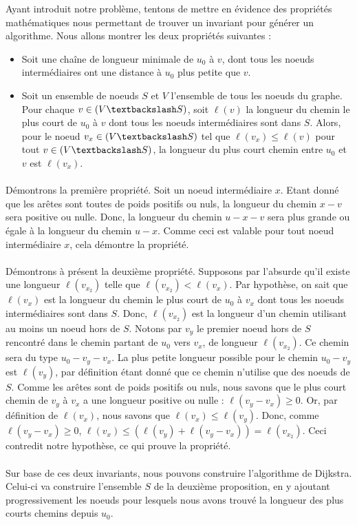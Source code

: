 
Ayant introduit notre problème, tentons de mettre en évidence des propriétés mathématiques nous permettant de trouver un invariant pour générer un algorithme. Nous allons montrer les deux propriétés suivantes : 
\begin{itemize}
	\item Soit une chaîne de longueur minimale de $u_0$ à $v$, dont tous les noeuds intermédiaires ont une distance à $u_0$ plus petite que $v$.
	\item Soit un ensemble de noeuds $S$ et $V$ l'ensemble de tous les noeuds du graphe. Pour chaque $v \in (V \textbackslash S)$, soit $\ell(v)$ la longueur du chemin le plus court de $u_0$ à $v$ dont tous les noeuds intermédiaires sont dans $S$. Alors, pour le noeud $v_x \in (V \textbackslash S)$ tel que $\ell(v_x) \leq \ell(v)$ pour tout $v \in (V \textbackslash S)$, la longueur du plus court chemin entre $u_0$ et $v$ est $\ell(v_x)$.
\end{itemize}

\paragraph{}

Démontrons la première propriété. Soit un noeud intermédiaire $x$. Etant donné que les arêtes sont toutes de poids positifs ou nuls, la longueur du chemin $x-v$ sera positive ou nulle. Donc, la longueur du chemin $u-x-v$ sera plus grande ou égale à la longueur du chemin $u-x$. Comme ceci est valable pour tout noeud intermédiaire $x$, cela démontre la propriété.

\paragraph{}

Démontrons à présent la deuxième propriété. Supposons par l'absurde qu'il existe une longueur $\ell(v_{x_2})$ telle que $\ell(v_{x_2})<\ell(v_x)$. Par hypothèse, on sait que $\ell(v_x)$ est la longueur du chemin le plus court de $u_0$ à $v_x$ dont tous les noeuds intermédiaires sont dans $S$. Donc, $\ell(v_{x_2})$ est la longueur d'un chemin utilisant au moins un noeud hors de $S$. Notons par $v_y$ le premier noeud hors de $S$ rencontré dans le chemin partant de $u_0$ vers $v_x$, de longueur $\ell(v_{x_2})$. Ce chemin sera du type $u_0 - v_y - v_x$. La plus petite longueur possible pour le chemin $u_0 - v_y$ est $\ell(v_y)$, par définition étant donné que ce chemin n'utilise que des noeuds de $S$. Comme les arêtes sont de poids positifs ou nuls, nous savons que le plus court chemin de $v_y$ à $v_x$ a une longueur positive ou nulle : $\ell(v_y - v_x) \geq 0$. Or, par définition de $\ell(v_x)$, nous savons que $\ell(v_x) \leq \ell(v_y)$. Donc, comme $\ell(v_y - v_x) \geq 0$, $\ell(v_x) \leq (\ell(v_y)+\ell(v_y - v_x))=\ell(v_{x_2})$. Ceci contredit notre hypothèse, ce qui prouve la propriété.

\paragraph{}

Sur base de ces deux invariants, nous pouvons construire l'algorithme de Dijkstra. Celui-ci va construire l'ensemble $S$ de la deuxième proposition, en y ajoutant progressivement les noeuds pour lesquels nous avons trouvé la longueur des plus courts chemins depuis $u_0$. 



